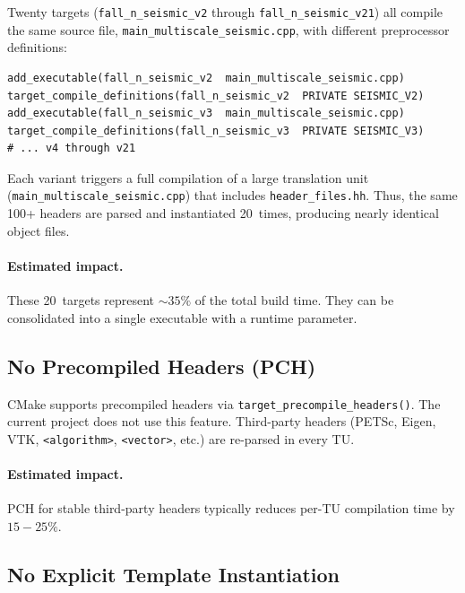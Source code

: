 Twenty targets (\texttt{fall\_n\_seismic\_v2} through
\texttt{fall\_n\_seismic\_v21}) all compile the same source file,
\texttt{main\_multiscale\_seismic.cpp}, with different preprocessor
definitions:

\begin{lstlisting}[caption={CMakeLists.txt excerpt.}]
add_executable(fall_n_seismic_v2  main_multiscale_seismic.cpp)
target_compile_definitions(fall_n_seismic_v2  PRIVATE SEISMIC_V2)
add_executable(fall_n_seismic_v3  main_multiscale_seismic.cpp)
target_compile_definitions(fall_n_seismic_v3  PRIVATE SEISMIC_V3)
# ... v4 through v21
\end{lstlisting}

Each variant triggers a full compilation of a large translation unit
(\texttt{main\_multiscale\_seismic.cpp}) that includes
\texttt{header\_files.hh}.  Thus, the same 100+ headers are parsed
and instantiated 20~times, producing nearly identical object files.

\paragraph{Estimated impact.}
These 20~targets represent ${\sim}35\%$ of the total build time.
They can be consolidated into a single executable with a
runtime parameter.


\subsection{No Precompiled Headers (PCH)}
\label{sec:build-no-pch}

CMake supports precompiled headers via
\texttt{target\_precompile\_headers()}.  The current project does
not use this feature.  Third-party headers (PETSc, Eigen, VTK,
\texttt{<algorithm>}, \texttt{<vector>}, etc.) are re-parsed in
every TU.

\paragraph{Estimated impact.}
PCH for stable third-party headers typically reduces per-TU
compilation time by $15{-}25\%$.


\subsection{No Explicit Template Instantiation}
\label{sec:build-no-explicit-inst}

